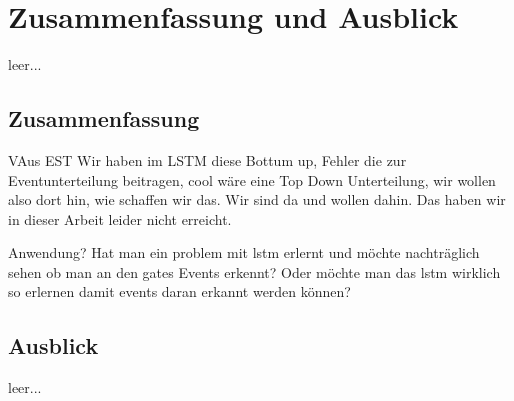 \chapter{Zusammenfassung und Ausblick} 
\label{ch:ende}
leer...
\section{Zusammenfassung}
VAus EST Wir haben im LSTM diese Bottum up, Fehler die zur Eventunterteilung beitragen, cool wäre eine Top Down Unterteilung, wir wollen also dort hin, wie schaffen wir das. Wir sind da und wollen dahin. Das haben wir in dieser Arbeit leider nicht erreicht.

Anwendung? Hat man ein problem mit lstm erlernt und möchte nachträglich sehen ob man an den gates Events erkennt? Oder möchte man das lstm wirklich so erlernen damit events daran erkannt werden können? 

\section{Ausblick}
leer...